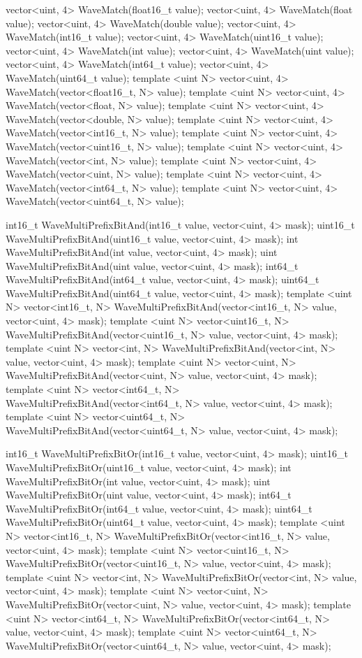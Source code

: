 \begin{HLSL}
vector<uint, 4> WaveMatch(float16_t value);
vector<uint, 4> WaveMatch(float value);
vector<uint, 4> WaveMatch(double value);
vector<uint, 4> WaveMatch(int16_t value);
vector<uint, 4> WaveMatch(uint16_t value);
vector<uint, 4> WaveMatch(int value);
vector<uint, 4> WaveMatch(uint value);
vector<uint, 4> WaveMatch(int64_t value);
vector<uint, 4> WaveMatch(uint64_t value);
template <uint N> vector<uint, 4> WaveMatch(vector<float16_t, N> value);
template <uint N> vector<uint, 4> WaveMatch(vector<float, N> value);
template <uint N> vector<uint, 4> WaveMatch(vector<double, N> value);
template <uint N> vector<uint, 4> WaveMatch(vector<int16_t, N> value);
template <uint N> vector<uint, 4> WaveMatch(vector<uint16_t, N> value);
template <uint N> vector<uint, 4> WaveMatch(vector<int, N> value);
template <uint N> vector<uint, 4> WaveMatch(vector<uint, N> value);
template <uint N> vector<uint, 4> WaveMatch(vector<int64_t, N> value);
template <uint N> vector<uint, 4> WaveMatch(vector<uint64_t, N> value);

int16_t WaveMultiPrefixBitAnd(int16_t value, vector<uint, 4> mask);
uint16_t WaveMultiPrefixBitAnd(uint16_t value, vector<uint, 4> mask);
int WaveMultiPrefixBitAnd(int value, vector<uint, 4> mask);
uint WaveMultiPrefixBitAnd(uint value, vector<uint, 4> mask);
int64_t WaveMultiPrefixBitAnd(int64_t value, vector<uint, 4> mask);
uint64_t WaveMultiPrefixBitAnd(uint64_t value, vector<uint, 4> mask);
template <uint N>
vector<int16_t, N> WaveMultiPrefixBitAnd(vector<int16_t, N> value, vector<uint, 4> mask);
template <uint N>
vector<uint16_t, N> WaveMultiPrefixBitAnd(vector<uint16_t, N> value, vector<uint, 4> mask);
template <uint N>
vector<int, N> WaveMultiPrefixBitAnd(vector<int, N> value, vector<uint, 4> mask);
template <uint N>
vector<uint, N> WaveMultiPrefixBitAnd(vector<uint, N> value, vector<uint, 4> mask);
template <uint N>
vector<int64_t, N> WaveMultiPrefixBitAnd(vector<int64_t, N> value, vector<uint, 4> mask);
template <uint N>
vector<uint64_t, N> WaveMultiPrefixBitAnd(vector<uint64_t, N> value, vector<uint, 4> mask);

int16_t WaveMultiPrefixBitOr(int16_t value, vector<uint, 4> mask);
uint16_t WaveMultiPrefixBitOr(uint16_t value, vector<uint, 4> mask);
int WaveMultiPrefixBitOr(int value, vector<uint, 4> mask);
uint WaveMultiPrefixBitOr(uint value, vector<uint, 4> mask);
int64_t WaveMultiPrefixBitOr(int64_t value, vector<uint, 4> mask);
uint64_t WaveMultiPrefixBitOr(uint64_t value, vector<uint, 4> mask);
template <uint N>
vector<int16_t, N> WaveMultiPrefixBitOr(vector<int16_t, N> value, vector<uint, 4> mask);
template <uint N>
vector<uint16_t, N> WaveMultiPrefixBitOr(vector<uint16_t, N> value, vector<uint, 4> mask);
template <uint N>
vector<int, N> WaveMultiPrefixBitOr(vector<int, N> value, vector<uint, 4> mask);
template <uint N>
vector<uint, N> WaveMultiPrefixBitOr(vector<uint, N> value, vector<uint, 4> mask);
template <uint N>
vector<int64_t, N> WaveMultiPrefixBitOr(vector<int64_t, N> value, vector<uint, 4> mask);
template <uint N>
vector<uint64_t, N> WaveMultiPrefixBitOr(vector<uint64_t, N> value, vector<uint, 4> mask);


\end{HLSL}
